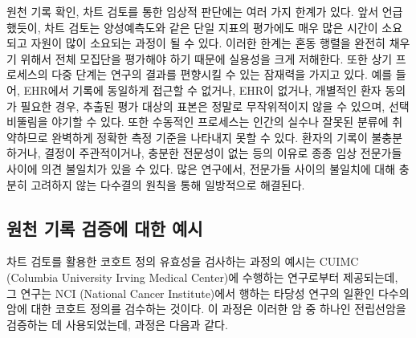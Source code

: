 \documentclass[10.5pt]{book}
\theoremstyle{definition}
\theoremstyle{definition}
\theoremstyle{definition}
\theoremstyle{remark}
\begin{document}
원천 기록 확인, 차트 검토를 통한 임상적 판단에는 여러 가지 한계가 있다.
앞서 언급했듯이, 차트 검토는 양성예측도와 같은 단일 지표의 평가에도 매우
많은 시간이 소요되고 자원이 많이 소요되는 과정이 될 수 있다. 이러한
한계는 혼동 행렬을 완전히 채우기 위해서 전체 모집단을 평가해야 하기
때문에 실용성을 크게 저해한다. 또한 상기 프로세스의 다중 단계는 연구의
결과를 편향시킬 수 있는 잠재력을 가지고 있다. 예를 들어, EHR에서 기록에
동일하게 접근할 수 없거나, EHR이 없거나, 개별적인 환자 동의가 필요한
경우, 추출된 평가 대상의 표본은 정말로 무작위적이지 않을 수 있으며,
선택비뚤림을 야기할 수 있다. 또한 수동적인 프로세스는 인간의 실수나
잘못된 분류에 취약하므로 완벽하게 정확한 측정 기준을 나타내지 못할 수
있다. 환자의 기록이 불충분하거나, 결정이 주관적이거나, 충분한 전문성이
없는 등의 이유로 종종 임상 전문가들 사이에 의견 불일치가 있을 수 있다.
많은 연구에서, 전문가들 사이의 불일치에 대해 충분히 고려하지 않는
다수결의 원칙을 통해 일방적으로 해결된다.

\subsection{원천 기록 검증에 대한 예시}\label{----}

차트 검토를 활용한 코호트 정의 유효성을 검사하는 과정의 예시는 CUIMC
(Columbia University Irving Medical Center)에 수행하는 연구로부터
제공되는데, 그 연구는 NCI (National Cancer Institute)에서 행하는 타당성
연구의 일환인 다수의 암에 대한 코호트 정의를 검수하는 것이다. 이 과정은
이러한 암 중 하나인 전립선암을 검증하는 데 사용되었는데, 과정은 다음과
같다.
\end{document}
